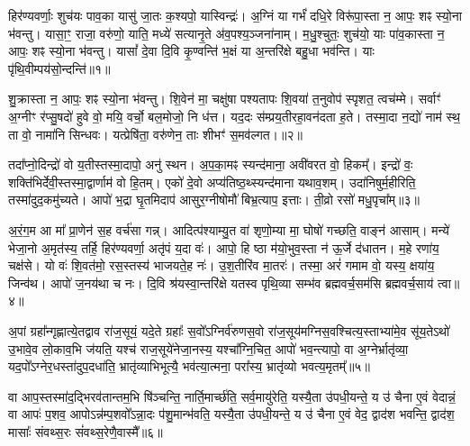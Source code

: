 \setcounter{anuvakam}{0}
हिर॑ण्यवर्णाः॒ शुच॑यः पाव॒का यासु॑ जा॒तः क॒श्यपो॒ यास्विन्द्रः॑। अ॒ग्निं या गर्भं॑ दधि॒रे विरू॑पा॒स्ता न॒ आपः॒ शꣴ स्यो॒ना भ॑वन्तु। यासा॒ꣳ॒ राजा॒ वरु॑णो॒ याति॒ मध्ये॑ सत्यानृ॒ते अ॑व॒पश्य॒ञ्जना॑नाम्। म॒धु॒श्चुतः॒ शुच॑यो॒ याः पा॑व॒कास्ता न॒ आपः॒ शꣴ स्यो॒ना भ॑वन्तु। यासां᳚ दे॒वा दि॒वि कृ॒ण्वन्ति॑ भ॒क्षं या अ॒न्तरि॑क्षे बहु॒धा भव॑न्ति। याः पृ॑थि॒वीम्पय॑सो॒न्दन्ति॑॥१॥

शु॒क्रास्ता न॒ आपः॒ शꣴ स्यो॒ना भ॑वन्तु। शि॒वेन॑ मा॒ चक्षु॑षा पश्यतापः शि॒वया॑ त॒नुवोप॑ स्पृशत॒ त्वच॑म्मे। सर्वाꣳ॑ अ॒ग्नीꣳ र॑प्सु॒षदो॑ हुवे वो॒ मयि॒ वर्चो॒ बल॒मोजो॒ नि ध॑त्त। यद॒दः स॑म्प्रय॒तीरहा॒वन॑दता ह॒ते। तस्मा॒दा न॒द्यो॑ नाम॑ स्थ॒ ता वो॒ नामा॑नि सिन्धवः। यत्प्रेषि॑ता॒ वरु॑णेन॒ ताः शीभꣳ॑ स॒मव॑ल्गत।॥२॥

तदा᳚प्नो॒दिन्द्रो॑ वो य॒तीस्तस्मा॒दापो॒ अनु॑ स्थन। अ॒प॒का॒मꣴ स्यन्द॑माना॒ अवी॑वरत वो॒ हिकम्᳚। इन्द्रो॑ वः॒ शक्ति॑भिर्देवी॒स्तस्मा॒द्वार्णाम॑ वो हि॒तम्। एको॑ दे॒वो अप्य॑तिष्ठ॒थ्स्यन्द॑माना यथाव॒शम्। उदा॑निषुर्म॒हीरिति॒ तस्मा॑दुद॒कमु॑च्यते। आपो॑ भ॒द्रा घृ॒तमिदाप॑ आसुर॒ग्नीषोमौ॑ बिभ्र॒त्याप॒ इत्ताः। ती॒व्रो रसो॑ मधु॒पृचा᳚म्॥३॥

अ॒रं॒ग॒म आ मा᳚ प्रा॒णेन॑ स॒ह वर्च॑सा गन्न्। आदित्प॑श्याम्यु॒त वा॑ शृणो॒म्या मा॒ घोषो॑ गच्छति॒ वाङ्न॑ आसाम्। मन्ये॑ भेजा॒नो अ॒मृत॑स्य॒ तर्\mbox{}हि॒ हिर॑ण्यवर्णा॒ अतृ॑पं य॒दा वः॑। आपो॒ हि ष्ठा म॑यो॒भुव॒स्ता न॑ ऊ॒र्जे द॑धातन। म॒हे रणा॑य॒ चक्ष॑से। यो वः॑ शि॒वत॑मो॒ रस॒स्तस्य॑ भाजयते॒ह नः॑। उ॒श॒तीरि॑व मा॒तरः॑। तस्मा॒ अरं॑ गमाम वो॒ यस्य॒ क्षया॑य॒ जिन्व॑थ। आपो॑ ज॒नय॑था च नः। दि॒वि श्र॑यस्वा॒न्तरि॑क्षे यतस्व पृथि॒व्या सम्भ॑व ब्रह्मवर्च॒सम॑सि ब्रह्मवर्च॒साय॑ त्वा॥४॥

{\anuvakamend[{उ॒न्दन्ति॑ स॒मव॑ल्गत मधु॒पृचा᳚म्मा॒तरो॒ द्वाविꣳ॑शतिश्च॥१॥}]}

अ॒पां ग्रहा᳚न्गृह्णात्ये॒तद्वाव रा॑ज॒सूयं॒ यदे॒ते ग्रहाः᳚ स॒वो᳚\-ऽग्निर्व॑रुणस॒वो रा॑ज॒सूय॑मग्निस॒वश्चित्य॒स्ताभ्या॑मे॒व सू॑य॒ते\-ऽथो॑ उ॒भावे॒व लो॒काव॒भि ज॑यति॒ यश्च॑ राज॒सूये॑नेजा॒नस्य॒ यश्चा᳚ग्नि॒चित॒ आपो॑ भव॒न्त्यापो॒ वा अ॒ग्नेर्भ्रातृ॑व्या॒ यद॒पो᳚\-ऽग्नेर॒धस्ता॑दुप॒दधा॑ति॒ भ्रातृ॑व्याभिभूत्यै॒ भव॑त्या॒त्मना॒ परा᳚स्य॒ भ्रातृ॑व्यो भवत्य॒मृतम्᳚॥५॥

वा आप॒स्तस्मा॑द॒द्भिरव॑तान्तम॒भि षि॑ञ्चन्ति॒ नार्ति॒मार्च्छ॑ति॒ सर्व॒मायु॑रेति॒ यस्यै॒ता उ॑पधी॒यन्ते॒ य उ॑ चैना ए॒वं वेदान्नं॒ वा आपः॑ प॒शव॒ आपो\-ऽन्न॑म्प॒शवो᳚\-ऽन्ना॒दः प॑शु॒मान्भ॑वति॒ यस्यै॒ता उ॑पधी॒यन्ते॒ य उ॑ चैना ए॒वं वेद॒ द्वाद॑श भवन्ति॒ द्वाद॑श॒ मासाः᳚ संवथ्स॒रः सं॑वथ्स॒रेणै॒वास्मै᳚॥६॥


